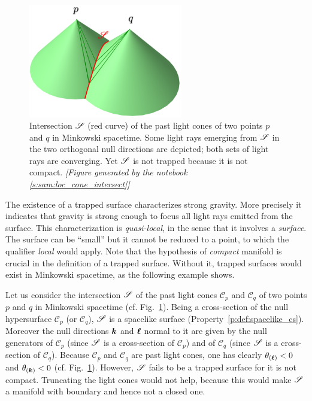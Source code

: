 \begin{figure}
\centerline{\includegraphics[width=0.6\textwidth]{loc_cone_intersect.png}}
\caption[]{\label{f:loc:cone_intersect} \footnotesize
Intersection $\mathscr{S}$ (red curve) of the past light cones of two points $p$ and $q$ in Minkowski spacetime.
Some light rays emerging from $\mathscr{S}$ in the two orthogonal null directions are depicted; both sets
of light rays are converging. Yet $\mathscr{S}$ is not trapped because it is not compact.
\textsl{[Figure generated by the notebook \ref{s:sam:loc_cone_intersect}]}
}
\end{figure}

The existence of a trapped surface characterizes
strong gravity. More precisely it indicates that gravity is strong enough
to focus all light rays emitted from the surface.
This characterization is \emph{quasi-local}, in the sense that it involves a \emph{surface}. The
surface can be ``small'' but it cannot be reduced to a point, to which the qualifier \emph{local}
would apply. Note that the hypothesis of \emph{compact} manifold is crucial in the definition of a
trapped surface. Without it, trapped surfaces would exist in Minkowski
spacetime, as the following example shows.

\begin{example}
Let us consider the intersection $\mathscr{S}$ of the past light cones $\mathscr{C}_p$ and $\mathscr{C}_q$
of two points $p$ and $q$ in Minkowski spacetime (cf. Fig.~\ref{f:loc:cone_intersect}).
Being a cross-section of the null hypersurface $\mathscr{C}_p$ (or $\mathscr{C}_q$),
$\mathscr{S}$ is a spacelike surface (Property~\ref{p:def:spacelike_cs}).
Moreover the null directions $\bm{k}$ and $\bm{\ell}$ normal to it are given by the null generators of
$\mathscr{C}_p$ (since $\mathscr{S}$ is a cross-section of $\mathscr{C}_p$)
and of $\mathscr{C}_q$ (since $\mathscr{S}$ is a cross-section of $\mathscr{C}_q$).
Because $\mathscr{C}_p$ and $\mathscr{C}_q$ are past light cones, one has clearly
$\theta_{(\bm{\ell})} < 0$ and $\theta_{(\bm{k})} < 0$ (cf. Fig.~\ref{f:loc:cone_intersect}).
However, $\mathscr{S}$ fails to be a trapped surface for it is not compact. Truncating the light cones
would not help, because this would make $\mathscr{S}$ a manifold with boundary and hence not a closed one.
\end{example}

